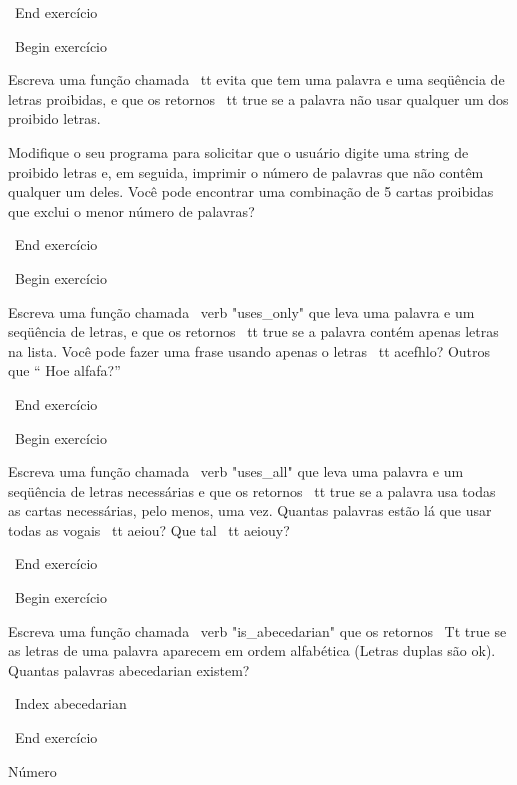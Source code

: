 \documentclass[10pt]{book}
\begin{document}
{{{{{{\ End {} exercício


\ Begin {} exercício 

Escreva uma função chamada {\ tt evita}
que tem uma palavra e uma seqüência de letras proibidas, e
que os retornos {\ tt true} se a palavra não usar qualquer um dos proibido
letras.

Modifique o seu programa para solicitar que o usuário digite uma string
de proibido letras e, em seguida, imprimir o número de palavras que
não contêm qualquer um deles.
Você pode encontrar uma combinação de 5 cartas proibidas que
exclui o menor número de palavras?

\ End {} exercício



\ Begin {} exercício

Escreva uma função chamada \ verb "uses_only" que leva uma palavra e um
seqüência de letras, e que os retornos {\ tt true} se a palavra contém
apenas letras na lista. Você pode fazer uma frase usando apenas o
letras {\ tt acefhlo}? Outros que `` Hoe alfafa?''

\ End {} exercício


\ Begin {} exercício 

Escreva uma função chamada \ verb "uses_all" que leva uma palavra e um
seqüência de letras necessárias e que os retornos {\ tt true} se a palavra
usa todas as cartas necessárias, pelo menos, uma vez. Quantas palavras estão lá
que usar todas as vogais {\ tt aeiou}? Que tal {\ tt aeiouy}?

\ End {} exercício


\ Begin {} exercício

Escreva uma função chamada \ verb "is_abecedarian" que os retornos
{\ Tt true} se as letras de uma palavra aparecem em ordem alfabética
(Letras duplas são ok).  
Quantas palavras abecedarian existem?

\ Index {} abecedarian

\ End {} exercício



Número%



}}}}}}
\end{document}
